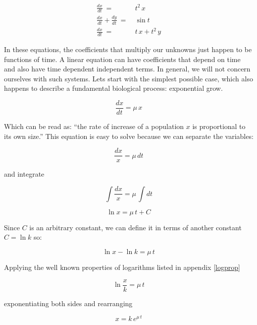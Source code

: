 \documentclass[12pt]{article}
\begin{document}
\begin{align}
	\frac{dx}{dt} \: = \: &  t^2 \, x	\\
	\frac{dx}{dt} + \frac{dy}{dt}\: = \: &  \sin t \\
	\frac{dx}{dt} \: = \: &  t \, x + t^2 \, y
\end{align}

In these equations, the coefficients that multiply our unknowns just happen to be functions of time. A linear equation can have coefficients that depend on time and also have time dependent independent terms. In general, we will not concern ourselves with such systems. Lets start with the simplest possible case, which also happens to describe a fundamental biological process: exponential grow.

\begin{equation}
	\label{odexp}
	\frac{dx}{dt} = \mu \, x
\end{equation}

Which can be read as: ``the rate of increase of a population $x$ is proportional to its own size.'' This equation is easy to solve because we can separate the variables:


\begin{equation}
	\frac{dx}{x} = \mu \, dt
\end{equation}

and integrate

\begin{equation}
	\int \frac{dx}{x} = \mu \, \int  dt
\end{equation}

\begin{equation}
	\ln{x} = \mu \, t + C
\end{equation}

Since $C$ is an arbitrary constant, we can define it in terms of another constant $C= \ln{k}$ so:

\begin{equation}
	\ln{x} - \ln{k}  = \mu \, t 
\end{equation}

Applying the well known properties of logarithms listed in appendix \ref{logprop}

\begin{equation}
	\ln{\frac{x}{k}}   = \mu \, t 
\end{equation}

exponentiating both sides and rearranging

\begin{equation}
	x   = k \, e^{\mu \, t}
\end{equation}
\end{document}
